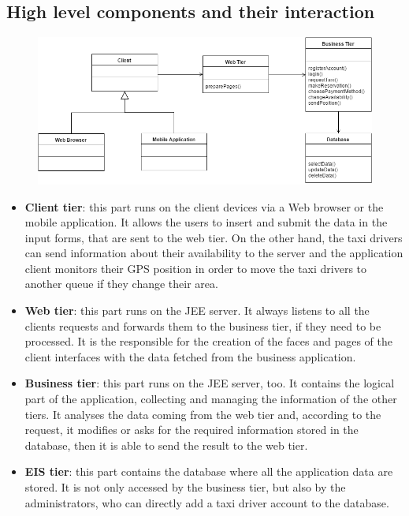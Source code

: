 		\subsection{High level components and their interaction}
			\vspace{1cm}
			\begin{figure}[h]
				\centering
				\includegraphics[scale=0.45]{HighLevelComp.png}
			\end{figure}
			\vspace{1cm}
			\begin{itemize}
				\item \textbf{Client tier}: this part runs on the client devices via a Web browser or the mobile application. It allows the users to insert and submit the data in the input forms, that are sent to the web tier. On the other hand, the taxi drivers can send information about their availability to the server and the application client monitors their GPS position in order to move the taxi drivers to another queue if they change their area. 
				\item \textbf{Web tier}: this part runs on the JEE server. It always listens to all the clients requests and forwards them to the business tier, if they need to be processed. It is the responsible for the creation of the faces and pages of the client interfaces with the data fetched from the business application.
				\item \textbf{Business tier}: this part runs on the JEE server, too. It contains the logical part of the application, collecting and managing the information of the other tiers. It analyses the data coming from the web tier and, according to the request, it modifies or asks for the required information stored in the database, then it is able to send the result to the web tier.  
				\item \textbf{EIS tier}: this part contains the database where all the application data are stored. It is not only accessed by the business tier, but also by the administrators, who can directly add a taxi driver account to the database. 
			\end{itemize}	
			
